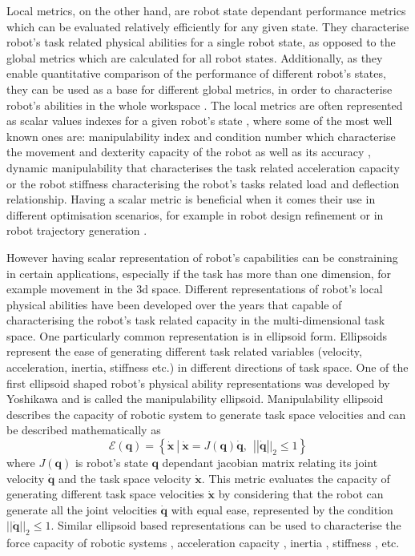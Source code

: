 Local metrics, on the other hand, are robot state dependant performance metrics which can be evaluated relatively efficiently for any given state. They characterise robot's task related physical abilities for a single robot state, as opposed to the global metrics which are calculated for all robot states. 
Additionally, as they enable quantitative comparison of the performance of different robot's states, they can be used as a base for different global metrics, in order to characterise robot's abilities in the whole workspace \cite{Zacharias2007}. The local metrics are often represented as scalar values indexes for a given robot's state \cite{Patel2015}, where some of the most well known ones are: manipulability index \cite{yoshikawa_manipulability_1985} and condition number \cite{Gosselin1991} which characterise the movement and dexterity capacity of the robot as well as its accuracy \cite{merlet_jacobian_2006}, dynamic manipulability \cite{yoshikawa1985dynamic} that characterises the task related acceleration capacity or the robot stiffness \cite{PASHKEVICH2011662} characterising the robot's tasks related load and deflection relationship.
Having a scalar metric is beneficial when it comes their use in different optimisation scenarios, for example in robot design refinement \cite{kucuk2005robot} or in robot trajectory generation \cite{Guilamo2006}. 

However having scalar representation of robot's capabilities can be constraining in certain applications, especially if the task has more than one dimension, for example movement in the 3d space. Different representations of robot's local physical abilities have been developed over the years that capable of characterising the robot's task related capacity in the multi-dimensional task space. One particularly common representation is in ellipsoid form. Ellipsoids represent the ease of generating different task related variables (velocity, acceleration, inertia, stiffness etc.) in different directions of task space. One of the first ellipsoid shaped robot's physical ability representations was developed by Yoshikawa \cite{yoshikawa_manipulability_1985} and is called the manipulability ellipsoid. Manipulability ellipsoid describes the capacity of robotic system to generate task space velocities and can be described mathematically as
\begin{equation}
    \mathcal{E}(\bm{q}) = \left\{ \dot{\bm{x}} ~|~ \dot{\bm{x}} = J(\bm{q})\dot{\bm{q}},~~ ||\dot{\bm{q}}||_2 \leq 1 \right\}
\end{equation}
where $J(\bm{q})$ is robot's state $\bm{q}$ dependant jacobian matrix relating its joint velocity $\dot{\bm{q}}$ and the task space velocity $\dot{\bm{x}}$. This metric evaluates the capacity of generating different task space velocities $\dot{\bm{x}}$ by considering that the robot can generate all the joint velocities $\dot{\bm{q}}$ with equal ease, represented by the condition $||\dot{\bm{q}}||_2 \leq 1$. Similar ellipsoid based representations can be used to characterise the force capacity of robotic systems \cite{chiacchio_global_1991}, acceleration capacity \cite{yoshikawa1985dynamic}, inertia \cite{Asada1984}, stiffness \cite{ajoudani2015role}, etc. 


